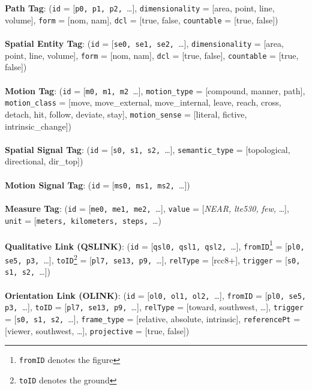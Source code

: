 \documentclass{article}
\begin{document}
\\
\\
{\bf Path Tag}: (\texttt{id} = [\texttt{p0, p1, p2, }\ldots], \texttt{dimensionality} = [{\sc area, point, line, volume}], \texttt{form} = [{\sc nom, nam}], \texttt{dcl} = [{\sc true, false}, \texttt{countable} = [{\sc true, false}])
\\
\\
{\bf Spatial Entity Tag}: (\texttt{id} = [\texttt{se0, se1, se2, }\ldots], \texttt{dimensionality} = [{\sc area, point, line, volume}], \texttt{form} = [{\sc nom, nam}], \texttt{dcl} = [{\sc true, false}], \texttt{countable} = [{\sc true, false}])
\\
\\
{\bf Motion Tag}: (\texttt{id} = [\texttt{m0, m1, m2 }\ldots], \texttt{motion\_type} = [{\sc compound, manner, path}],\\\texttt{motion\_class} = [{\sc move, move\_external, move\_internal, leave, reach, cross, detach, hit, follow, deviate, stay}], \texttt{motion\_sense} = [{\sc literal, fictive, intrinsic\_change}])
\\
\\
{\bf Spatial Signal Tag}: (\texttt{id} = [\texttt{s0, s1, s2, }\ldots], \texttt{semantic\_type} = [{\sc topological, directional, dir\_top}])
\\
\\
{\bf Motion Signal Tag}: (\texttt{id} = [\texttt{ms0, ms1, ms2, }\ldots])
\\
\\
{\bf Measure Tag}: (\texttt{id} = [\texttt{me0, me1, me2, }\ldots], \texttt{value} = [\emph{NEAR, lte530, few, }\ldots], \texttt{unit} = [\texttt{meters, kilometers, steps, }\ldots)
\\
\\
{\bf Qualitative Link (QSLINK)}: (\texttt{id} = [\texttt{qsl0, qsl1, qsl2, }\ldots], \texttt{fromID}\footnote{\texttt{fromID} denotes the figure} = [\texttt{pl0, se5, p3, }\ldots], \texttt{toID}\footnote{\texttt{toID} denotes the ground} = [\texttt{pl7, se13, p9, }\ldots], \texttt{relType} = [{\sc rcc8}+], \texttt{trigger} = [\texttt{s0, s1, s2, }\ldots])
\\
\\
{\bf Orientation Link (OLINK)}: (\texttt{id} = [\texttt{ol0, ol1, ol2, }\ldots], \texttt{fromID} = [\texttt{pl0, se5, p3, }\ldots], \texttt{toID} = [\texttt{pl7, se13, p9, }\ldots], \texttt{relType} = [{\sc toward, southwest, }\ldots], \texttt{trigger} = [\texttt{s0, s1, s2, }\ldots], \texttt{frame\_type} = [{\sc relative, absolute, intrinsic}], \texttt{referencePt} = [{\sc viewer, southwest, }\ldots], \texttt{projective} = [{\sc true, false}])
\end{document}
